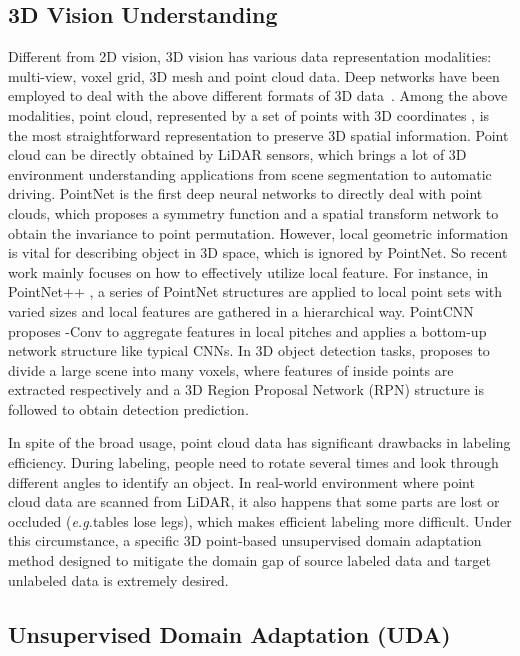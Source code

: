 \documentclass{article}
\newcommand*\eg{\textit{e.g.}}
\begin{document}
\subsection{3D Vision Understanding}

Different from 2D vision, 3D vision has various data representation modalities:  multi-view, voxel grid, 3D mesh and point cloud data. Deep networks have been employed to deal with the above different formats of 3D data~\cite{su2015multi,maturana2015voxnet,you2018pvnet, feng2019meshnet}. Among the above modalities, point cloud, represented by a set of points with 3D coordinates , is the most straightforward representation to preserve 3D spatial information. Point cloud can be directly obtained by LiDAR sensors, which brings a lot of 3D environment understanding applications from scene segmentation to automatic driving. PointNet \cite{qi2017pointnet} is the first deep neural networks to directly deal with point clouds, which proposes a symmetry function and a spatial transform network to obtain the invariance to point permutation. However, local geometric information is vital for describing object in 3D space, which is ignored by PointNet. So recent work mainly focuses on how to effectively utilize local feature. For instance, in PointNet++ \cite{qi2017pointnet++}, a series of PointNet structures are applied to local point sets with varied sizes and local features are gathered in a hierarchical way. PointCNN \cite{li2018pointcnn} proposes -Conv to aggregate features in local pitches and applies a bottom-up network structure like typical CNNs. In 3D object detection tasks, \cite{zhou2018voxelnet} proposes to divide a large scene into many voxels, where features of inside points are extracted respectively and a 3D Region Proposal Network (RPN) structure is followed to obtain detection prediction.

In spite of the broad usage, point cloud data has significant drawbacks in labeling efficiency. During labeling, people need to rotate several times and look through different angles to identify an object. In real-world environment where point cloud data are scanned from LiDAR, it also happens that some parts are lost or occluded (\eg{tables lose legs}), which makes efficient labeling more difficult. Under this circumstance, a specific 3D point-based unsupervised domain adaptation method designed to mitigate the domain gap of source labeled data and target unlabeled data is extremely desired.


\subsection{Unsupervised Domain Adaptation (UDA)}
\end{document}
